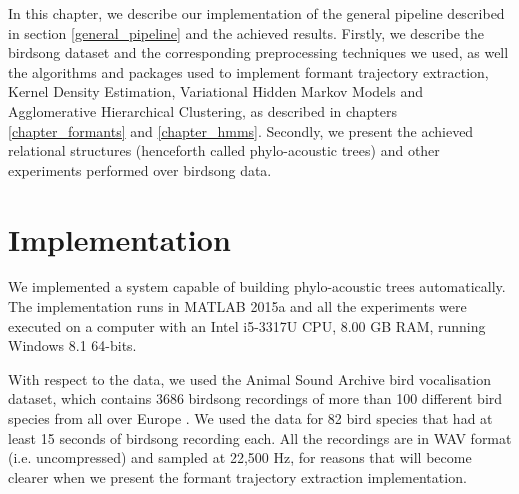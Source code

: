 \documentclass[../main.tex]{subfiles}
\begin{document}
 \label{chapter_account}
In this chapter, we describe our implementation of the general pipeline described in section \ref{general_pipeline} and the achieved results. Firstly, we describe the birdsong dataset and the corresponding preprocessing techniques we used, as well the algorithms and packages used to implement formant trajectory extraction, Kernel Density Estimation, Variational Hidden Markov Models and Agglomerative Hierarchical Clustering, as described in chapters \ref{chapter_formants} and \ref{chapter_hmms}. Secondly, we present the achieved relational structures (henceforth called phylo-acoustic trees) and other experiments performed over birdsong data.

\section{Implementation} \label{section_implementation}
We implemented a system capable of building phylo-acoustic trees automatically. The implementation runs in MATLAB 2015a and all the experiments were executed on a computer with an Intel i5-3317U CPU, 8.00 GB RAM, running Windows 8.1 64-bits. 
\par With respect to the data, we used the Animal Sound Archive bird vocalisation dataset, which contains 3686 birdsong recordings of more than 100 different bird species from all over Europe \cite{AnimalSoundArchive2015}. We used the data for 82 bird species that had at least 15 seconds of birdsong recording each. All the recordings are in WAV format (i.e. uncompressed) and sampled at 22,500 Hz, for reasons that will become clearer when we present the formant trajectory extraction implementation. 
\end{document}
